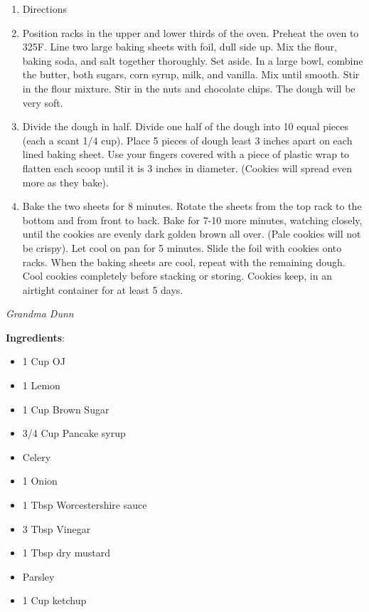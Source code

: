 \documentclass[11pt, twoside, openany]{book}
\begin{document}
\vspace{-3mm}\begin{enumerate}\setlength\itemsep{-1mm}
\item Directions
\item Position racks in the upper and lower thirds of the oven. Preheat the oven to 325F. Line two large baking sheets with foil, dull side up. Mix the flour, baking soda, and salt together thoroughly. Set aside. In a large bowl, combine the butter, both sugars, corn syrup, milk, and vanilla. Mix until smooth. Stir in the flour mixture. Stir in the nuts and chocolate chips. The dough will be very soft.
\item Divide the dough in half. Divide one half of the dough into 10 equal pieces (each a scant 1/4 cup). Place 5 pieces of dough least 3 inches apart on each lined baking sheet. Use your fingers covered with a piece of plastic wrap to flatten each scoop until it is 3 inches in diameter. (Cookies will spread even more as they bake).
\item Bake the two sheets for 8 minutes. Rotate the sheets from the top rack to the bottom and from front to back. Bake for 7-10 more minutes, watching closely, until the cookies are evenly dark golden brown all over. (Pale cookies will not be crispy). Let cool on pan for 5 minutes. Slide the foil with cookies onto racks. When the baking sheets are cool, repeat with the remaining dough. Cool cookies completely before stacking or storing. Cookies keep, in an airtight container for at least 5 days.
\end{enumerate}
 \label{grandma-dunn's-rib-sauce}\hfill\textit{Grandma Dunn}\\
\begin{minipage}[t]{0.8\linewidth}
\textbf{Ingredients}:\vspace{-3mm}
\begin{multicols}{2}
\begin{itemize}\setlength\itemsep{-1mm}
\item 1 Cup OJ
\item 1 Lemon
\item 1 Cup Brown Sugar
\item 3/4 Cup Pancake syrup
\item Celery
\item 1 Onion
\item 1 Tbsp Worcestershire sauce
\item 3 Tbsp Vinegar
\item 1 Tbsp dry mustard
\item Parsley
\item 1 Cup ketchup
\end{itemize}
\end{multicols}
\end{minipage}
\end{document}
